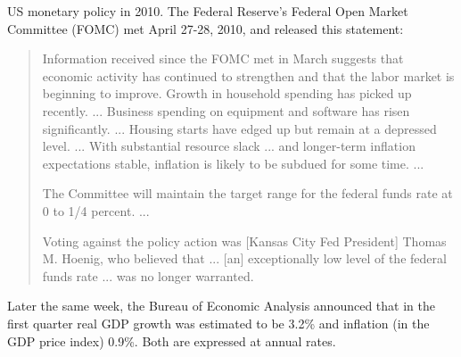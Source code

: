 \documentclass[12pt]{exam}
\begin{document}
\begin{questions}
\begin{solution}
\end{solution}

\question US monetary policy in 2010.
The Federal Reserve's Federal Open Market Committee (FOMC)
met April 27-28, 2010, and released this statement:
%
\begin{quote}
Information received since the FOMC met in March suggests that economic activity has continued to strengthen and that the labor market is beginning to improve. Growth in household spending has picked up recently.  ...
Business spending on equipment and software has risen significantly. ...
Housing starts have edged up but remain at a depressed level. ...
With substantial resource slack ... and longer-term inflation expectations stable, inflation is likely to be subdued for some time. ...

The Committee will maintain the target range for the federal funds rate at 0 to 1/4 percent.  ...

Voting against the policy action was [Kansas City Fed President]
Thomas M. Hoenig, who believed that ... [an] exceptionally low level
of the federal funds rate ...  was no longer warranted.
\end{quote}
%
Later the same week, the Bureau of Economic Analysis announced that
in the first quarter real GDP growth was estimated to be 3.2\% and
inflation (in the GDP price index) 0.9\%.
Both are expressed at annual rates.

\end{questions}
\end{document}
